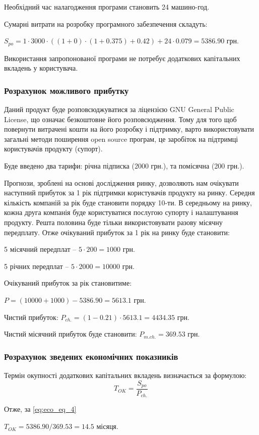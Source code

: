 \par Необхідний час налагодження програми становить 24 машино-год.
\par Сумарні витрати на розробку програмного забезпечення складуть:
	\par
\begin{center}
	$S_{po} = 1\cdot3000\cdot((1+0)\cdot(1+0.375)+0.42)+24\cdot0.079=5386.90$ грн.
\end{center}
\par Використання запропонованої програми не потребує додаткових капітальних вкладень у користувача.


\subsubsection{Розрахунок можливого прибутку}
\par Даний продукт буде розповсюджуватися за ліцензією GNU General Public License, що означає безкоштовне його розповсюдження. Тому для того щоб повернути витрачені кошти на його розробку і підтримку, варто використовувати загальні методи поширення open source програм, це заробіток на підтримці користувачів продукту (супорт). 
\par Буде введено два тарифи: річна підписка (2000 грн.), та помісячна (200 грн.).
\par Прогнози, зроблені на основі дослідження ринку, дозволяють нам очікувати наступний прибуток за 1 рік підтримки користувачів продукту на ринку. Середня кількість компаній за рік буде становити порядку 10-ти. В середньому на ринку, кожна друга компанія буде користуватися послугою супорту і налаштування продукту. Решта половина буде тільки використовувати разову місячну передплату. Отже очікуваний прибуток за 1 рік на ринку буде становити:
\par 5 місячний передплат -- $5\cdot200 = 1000$ грн.
\par 5 річних передплат -- $5\cdot2000 = 10000$ грн.
\par Очікуваний прибуток за рік становитиме: 
\par $P = (10000+1000)-5386.90 = 5613.1$ грн.
\par Чистий прибуток: $P_{ch.} = (1-0.21)\cdot5613.1=4434.35$ грн.
\par Чистий місячний прибуток буде становити: $P_{m.ch.}=369.53$ грн.


\subsubsection{Розрахунок зведених економічних показників}
\par Термін   окупності   додаткових   капітальних   вкладень   визначається   за формулою:
\begin{equation}\label{eq:eco_eq_4}
	T_{OK} = \frac{S_{po}}{P_{ch.}}
\end{equation}
\par Отже, за \eqref{eq:eco_eq_4}
\begin{center}
	$T_{OK}=5386.90/369.53=14.5$ місяця.
\end{center}

